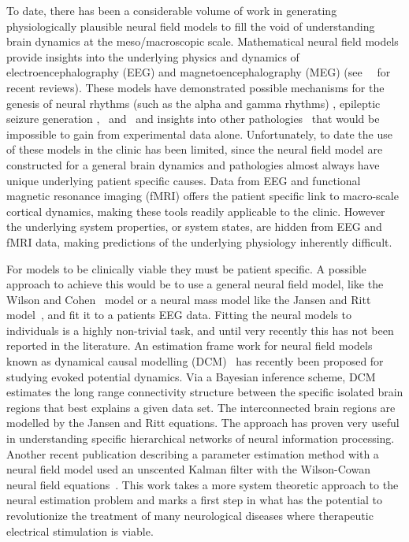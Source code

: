 \documentclass[12pt]{iopart}		%
\begin{document}
To date, there has been a considerable volume of work in generating physiologically plausible neural field models to fill the void of understanding brain dynamics at the meso/macroscopic scale. Mathematical neural field  models provide insights into the underlying physics and dynamics of electroencephalography (EEG) and magnetoencephalography (MEG) (see~\cite{Deco2008}~\cite{David2003} for recent reviews). These models have demonstrated possible mechanisms for the genesis of neural rhythms (such as the alpha and gamma rhythms) \cite{Liley1999} \cite{RENNIE2000}, epileptic seizure generation \cite{DaSilva2003},~\cite{Suffczynski2004} and~\cite{Wendling2005} and insights into other pathologies~\cite{Moran2008} \cite{Schiff2009} that would be impossible to gain from experimental data alone. Unfortunately, to date the use of these models in the clinic has been limited, since the neural field model are constructed for a general brain dynamics and pathologies almost always have unique underlying patient specific causes. Data from EEG and functional magnetic resonance imaging (fMRI) offers the patient specific link to macro-scale cortical dynamics, making these tools readily applicable to the clinic. However the underlying system properties, or system states, are hidden from EEG and fMRI data, making predictions of the underlying physiology inherently difficult.

For models to be clinically viable they must be patient specific. A possible approach to achieve this would be to use a general neural field model, like the Wilson and Cohen~\cite{Wilson1973} model or a neural mass model like the Jansen and Ritt model~\cite{Jansen1995}, and fit it to a patients EEG data. Fitting the neural models to individuals is a highly non-trivial task, and until very recently this has not been reported in the literature. An estimation frame work for neural field models known as dynamical causal modelling (DCM)~\cite{David2003} \cite{David2006} has recently been proposed for studying evoked potential dynamics. Via a Bayesian inference scheme, DCM estimates the long range connectivity structure between the specific isolated brain regions that best explains a given data set. The interconnected brain regions are modelled by the Jansen and Ritt equations. The approach has proven very useful in understanding specific hierarchical networks of neural information processing. Another recent publication describing a parameter estimation method with a neural field model used an unscented Kalman filter with the Wilson-Cowan neural field equations~\cite{schiff2008kalman}.  This work takes a more system theoretic approach to the neural estimation problem and marks a first step in what has the potential to revolutionize the treatment of many neurological diseases where therapeutic electrical stimulation is viable.
\end{document}
